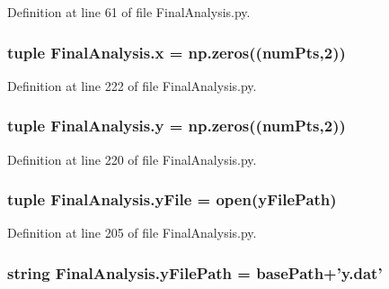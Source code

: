 Definition at line 61 of file Final\-Analysis.\-py.

\hypertarget{namespace_final_analysis_a53f403035b6d6abe6c7e2d7c07601b1d}{
\subsubsection[{x}]{\setlength{\rightskip}{0pt plus 5cm}tuple Final\-Analysis.\-x = np.\-zeros(({\bf num\-Pts},2))}}\label{namespace_final_analysis_a53f403035b6d6abe6c7e2d7c07601b1d}


Definition at line 222 of file Final\-Analysis.\-py.

\hypertarget{namespace_final_analysis_af061a7f615d51259e7a6720b6f39f02d}{
\subsubsection[{y}]{\setlength{\rightskip}{0pt plus 5cm}tuple Final\-Analysis.\-y = np.\-zeros(({\bf num\-Pts},2))}}\label{namespace_final_analysis_af061a7f615d51259e7a6720b6f39f02d}


Definition at line 220 of file Final\-Analysis.\-py.

\hypertarget{namespace_final_analysis_a73049f17326c78323b2344dc7cb4c05d}{
\subsubsection[{y\-File}]{\setlength{\rightskip}{0pt plus 5cm}tuple Final\-Analysis.\-y\-File = open({\bf y\-File\-Path})}}\label{namespace_final_analysis_a73049f17326c78323b2344dc7cb4c05d}


Definition at line 205 of file Final\-Analysis.\-py.

\hypertarget{namespace_final_analysis_ad8aaf10ff3415780cc1c8fcd7990395a}{
\subsubsection[{y\-File\-Path}]{\setlength{\rightskip}{0pt plus 5cm}string Final\-Analysis.\-y\-File\-Path = base\-Path+'y.\-dat'}}\label{namespace_final_analysis_ad8aaf10ff3415780cc1c8fcd7990395a}


